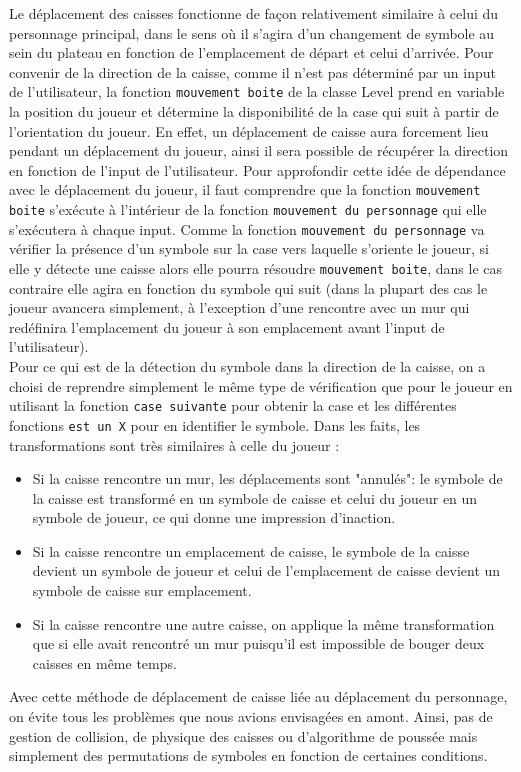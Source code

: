\documentclass[a4paper,12pt]{article} %
\begin{document}
Le déplacement des caisses fonctionne de façon relativement similaire à celui du personnage principal, dans le sens où il s'agira d'un changement de symbole au sein du plateau en fonction de l'emplacement de départ et celui d'arrivée. Pour convenir de la direction de la caisse, comme il n'est pas déterminé par un input de l'utilisateur, la fonction \texttt{mouvement boite} de la classe Level prend en variable la position du joueur et détermine la disponibilité de la case qui suit à partir de l'orientation du joueur. En effet, un déplacement de caisse aura forcement lieu pendant un déplacement du joueur, ainsi il sera possible de récupérer la direction en fonction de l'input de l'utilisateur. Pour approfondir cette idée de dépendance avec le déplacement du joueur, il faut comprendre que la fonction \texttt{mouvement boite} s'exécute à l'intérieur de la fonction \texttt{mouvement du personnage} qui elle s'exécutera à chaque input. Comme la fonction \texttt{mouvement du personnage} va vérifier la présence d'un symbole sur la case vers laquelle s'oriente le joueur, si elle y détecte une caisse alors elle pourra résoudre \texttt{mouvement boite}, dans le cas contraire elle agira en fonction du symbole qui suit (dans la plupart des cas le joueur avancera simplement, à l'exception d'une rencontre avec un mur qui redéfinira l'emplacement du joueur à son emplacement avant l'input de l'utilisateur).
\\
Pour ce qui est de la détection du symbole dans la direction de la caisse, on a choisi de reprendre simplement le même type de vérification que pour le joueur en utilisant la fonction \texttt{case suivante} pour obtenir la case et les différentes fonctions \texttt{est un X} pour en identifier le symbole. Dans les faits, les transformations sont très similaires à celle du joueur :
\begin{itemize}
\item Si la caisse rencontre un mur, les déplacements sont "annulés": le symbole de la caisse est transformé en un symbole de caisse et celui du joueur en un symbole de joueur, ce qui donne une impression d'inaction.
\item Si la caisse rencontre un emplacement de caisse, le symbole de la caisse devient un symbole de joueur et celui de l'emplacement de caisse devient un symbole de caisse sur emplacement.
\item Si la caisse rencontre une autre caisse, on applique la même transformation que si elle avait rencontré un mur puisqu'il est impossible de bouger deux caisses en même temps.
\end{itemize}
Avec cette méthode de déplacement de caisse liée au déplacement du personnage, on évite tous les problèmes que nous avions envisagées en amont. Ainsi, pas de gestion de collision, de physique des caisses ou d'algorithme de poussée mais simplement des permutations de symboles en fonction de certaines conditions.
\end{document}

